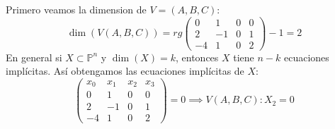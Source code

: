 
{
    Primero veamos la dimension de $V = (A, B, C)$:
    \[
        \dim(V(A,B,C)) =
        rg \begin{pmatrix}
            0 & 1 & 0 & 0 \\
            2 & -1 & 0 & 1 \\
            -4 & 1 & 0 & 2
        \end{pmatrix} - 1 = 2
    \]
    En general si $X \subset \mathbb{P}^n$ y $\dim(X) = k$, entonces $X$ tiene $n-k$ ecuaciones implícitas. Así obtengamos las ecuaciones implícitas de $X$:
    \[
        \begin{pmatrix}
            x_0 & x_1 & x_2 & x_3 \\
            0 & 1 & 0 & 0 \\
            2 & -1 & 0 & 1 \\
            -4 & 1 & 0 & 2
        \end{pmatrix} = 0 \implies V(A,B,C) : X_2 = 0
    \]
}

